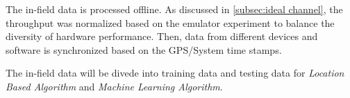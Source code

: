 The in-field data is processed offline. As discussed in \ref{subsec:ideal channel}, the throughput was normalized based on the emulator experiment to balance the diversity of hardware performance. Then, data from different devices and software is synchronized based on the GPS/System time stamps.

The in-field data will be divede into training data and testing data for \emph{Location Based Algorithm} and \emph{Machine Learning Algorithm}.






